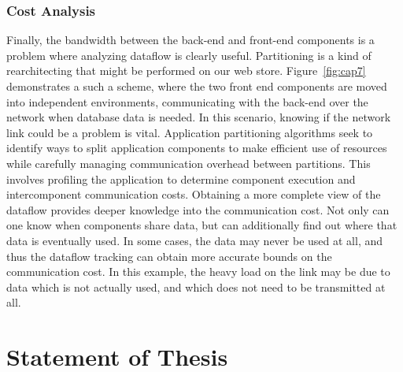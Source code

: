 \documentclass[msc,oneside]{ubcthesis}
\begin{document}
\subsubsection{Cost Analysis}
Finally, the bandwidth between the back-end and front-end components is a problem where analyzing dataflow is clearly useful. Partitioning is a kind of rearchitecting that might be performed on our web store. Figure~\ref{fig:cap7} demonstrates a such a scheme, where the two front end components are moved into independent environments, communicating with the back-end over the network when database data is needed. In this scenario, knowing if the network link could be a problem is vital. Application partitioning algorithms seek to identify ways to split application components to make efficient use of resources while carefully managing communication overhead between partitions. This involves profiling the application to determine component execution and intercomponent communication costs. Obtaining a more complete view of the dataflow provides deeper knowledge into the communication cost. Not only can one know when components share data, but can additionally find out where that data is eventually used. In some cases, the data may never be used at all, and thus the dataflow tracking can obtain more accurate bounds on the communication cost. In this example, the heavy load on the link may be due to data which is not actually used, and which does not need to be transmitted at all.
	

\section{Statement of Thesis}
	
\end{document}
